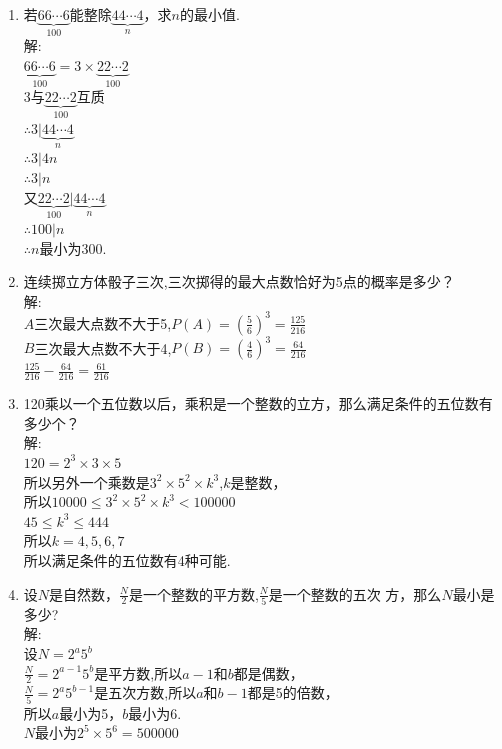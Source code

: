 \documentclass[12pt,oneside,a4paper]{ctexbook} %
\numberwithin{chapter}{part}
\begin{document}
\begin{enumerate}
\item 
若$\underbrace{66\cdots6}_{100}$能整除$\underbrace{44\cdots4}_{n}$，求$n$的最小值.\\
解:\\
$\underbrace{66\cdots6}_{100}=3\times\underbrace{22\cdots2}_{100}$\\
3与$\underbrace{22\cdots2}_{100}$互质\\
$\therefore 3|\underbrace{44\cdots4}_{n}$\\
$\therefore 3|4n$\\
$\therefore 3|n$\\
又$\underbrace{22\cdots2}_{100}|\underbrace{44\cdots4}_{n}$\\
$\therefore 100|n$\\
$\therefore n$最小为300.

\item 
连续掷立方体骰子三次,三次掷得的最大点数恰好为5点的概率是多少？\\
解:\\
$A$三次最大点数不大于5,$P(A)=(\frac{5}{6})^3=\frac{125}{216}$\\
$B$三次最大点数不大于4,$P(B)=(\frac{4}{6})^3=\frac{64}{216}$\\
$\frac{125}{216}-\frac{64}{216}=\frac{61}{216}$

\item 
120乘以一个五位数以后，乘积是一个整数的立方，那么满足条件的五位数有多少个？\\
解:\\
$120=2^3\times3\times5$\\
所以另外一个乘数是$3^2\times5^2\times k^3$,$k$是整数，\\
所以$10000\leq3^2\times5^2\times k^3<100000$\\
$45 \leq k^3 \leq 444$\\
所以$k=4,5,6,7$\\
所以满足条件的五位数有4种可能.

\item 
设$N$是自然数，$\frac{N}{2}$是一个整数的平方数,$\frac{N}{5}$是一个整数的五次
方，那么$N$最小是多少?\\
解:\\
设$N=2^a5^b$\\
$\frac{N}{2}=2^{a-1}5^b$是平方数,所以$a-1$和$b$都是偶数，\\
$\frac{N}{5}=2^a5^{b-1}$是五次方数,所以$a$和$b-1$都是5的倍数，\\
所以$a$最小为5，$b$最小为6.\\
$N$最小为$2^5\times5^6=500000$


\end{enumerate}
\end{document}
